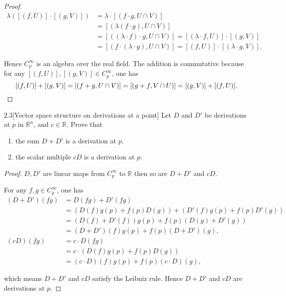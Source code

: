 \begin{proof}
\begin{align*}
        \lambda([(f, U)]\cdot [(g, V)])                     & = \lambda\cdot[(f\cdot g, U\cap V)]                                           \\
                                                            & = [(\lambda(f\cdot g), U\cap V)]                                              \\
                                                            & = [((\lambda\cdot f)\cdot g, U\cap V)] = [(\lambda\cdot f, U)]\cdot [(g, V)]  \\
                                                            & = [(f\cdot (\lambda\cdot g), U\cap V)] = [(f, U)]\cdot [(\lambda\cdot g, V)].
    \end{align*}
    \endgroup

    Hence \( C^{\infty}_{p} \) is an algebra over the real field. The addition is commutative because for any \( [(f, U)], [(g, V)] \in C^{\infty}_{p} \), one has
    \[
        [(f, U)] + [(g, V)] = [(f + g, U\cap V)] = [(g + f, V\cap U)] = [(g, V)] + [(f, U)].\qedhere
    \]
\end{proof}

\begin{problem}{2.3}[Vector space structure on derivations at a point]
Let \( D \) and \( D' \) be derivations at \( p \) in \( \mathbb{R}^{n} \), and \( c\in \mathbb{R} \). Prove that
\begin{enumerate}[label={(\alph*)},leftmargin=*,itemsep=0pt]
    \item the sum \( D + D' \) is a derivation at \( p \).
    \item the scalar multiple \( cD \) is a derivation at \( p \).
\end{enumerate}
\end{problem}

\begin{proof}
    \( D, D' \) are linear maps from \( C^{\infty}_{p} \) to \( \mathbb{R} \) then so are \( D + D' \) and \( cD \).

    For any \( f, g \in C^{\infty}_{p} \), one has
    \begingroup
    \allowdisplaybreaks%
    \begin{align*}
        (D + D')(fg) & = D(fg) + D'(fg)                                  \\
                     & = (D(f)g(p) + f(p)D(g)) + (D'(f)g(p) + f(p)D'(g)) \\
                     & = (D(f) + D'(f))g(p) + f(p)(D(g) + D'(g))         \\
                     & = (D + D')(f)g(p) + f(p)(D + D')(g),              \\
        (cD)(fg)     & = c\cdot D(fg)                                    \\
                     & = c\cdot (D(f)g(p) + f(p)D(g))                    \\
                     & = (c\cdot D)(f)g(p) + f(p)(c\cdot D)(g),
    \end{align*}
    \endgroup

    which means \( D + D' \) and \( cD \) satisfy the Leibniz rule. Hence \( D + D' \) and \( cD \) are derivations at \( p \).
\end{proof}

